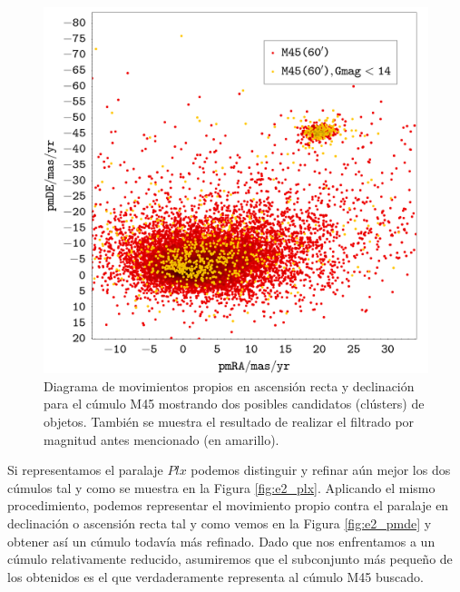\documentclass[a4paper,fleqn,usenatbib]{mnras}
\begin{document}
\begin{figure}
  \includegraphics[width=\linewidth]{img/ejercicio2_m45_pmde_pmra_14}
  \caption{Diagrama de movimientos propios en ascensión recta y declinación para el cúmulo M45 mostrando dos posibles candidatos (clústers) de objetos. También se muestra el resultado de realizar el filtrado por magnitud antes mencionado (en amarillo).}
  \label{fig:e2_pmrapmde}
\end{figure}

Si representamos el paralaje $Plx$ podemos distinguir y refinar aún mejor los dos cúmulos tal y como se muestra en la Figura \ref{fig:e2_plx}. Aplicando el mismo procedimiento, podemos representar el movimiento propio contra el paralaje en declinación o ascensión recta tal y como vemos en la Figura \ref{fig:e2_pmde} y obtener así un cúmulo todavía más refinado. Dado que nos enfrentamos a un cúmulo relativamente reducido, asumiremos que el subconjunto más pequeño de los obtenidos es el que verdaderamente representa al cúmulo M45 buscado.
\end{document}
